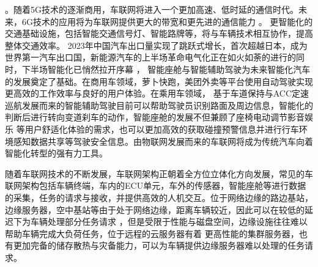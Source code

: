 \cite{陈进2020浅析中国城市智能交通系统产业化发展趋势}。随着5G技术的逐渐商用，车联网将进入一个更加高速、低时延的通信时代。未来，6G技术的应用将为车联网提供更大的带宽和更先进的通信能力 \cite{6GforVehicle}。
更智能化的交通基础设施，包括智能交通信号灯、智能路牌等，将与车辆技术相互协作，提高整体交通效率。
2023年中国汽车出口量实现了跳跃式增长，首次超越日本，成为世界第一汽车出口国，新能源汽车的上半场革命电气化正在如火如荼的进行的同时，下半场智能化已悄然拉开序幕 \cite{Integrationofelectric}，
智能座舱与智能辅助驾驶为未来智能化汽车的发展奠定了基础。在商用车领域，萝卜快跑，美团外卖等平台使用自动驾驶实现更高效的工作效率与良好的用户体验。在乘用车领域，
基于车道保持与ACC定速巡航发展而来的智能辅助驾驶目前可以帮助驾驶员识别路面及周边信息，智能化的判断后进行转向变道刹车的动作，智能座舱的发展不但兼顾了座椅电动调节影音娱乐
等用户舒适化体验的需求，也可以更加高效的获取碰撞预警信息并进行行车环境感知数据共享等驾驶安全信息。由物联网发展而来的车联网将成为传统汽车向着智能化转型的强有力工具。

随着车联网技术的不断发展，车联网架构正朝着全方位立体化方向发展，常见的车联网架构包括车辆终端，车内的ECU单元，车外的传感器，智能座舱等进行数据的采集，任务的请求与接收，并提供高效的人机交互。位于网络边缘的路边基站，边缘服务器，空中基站等由于处于网络边缘，距离车辆较近，因此可以在较低的延迟下为车辆处理部分任务请求 \cite{EdgeComputing2019}，但是受限于性能与磁盘空间，边缘设施往往难以帮助车辆完成大负荷任务，位于远程的云服务器有着
更高性能的集群服务器，也有更加完备的储存散热与灾备能力，可以为车辆提供边缘服务器难以处理的任务请求。


